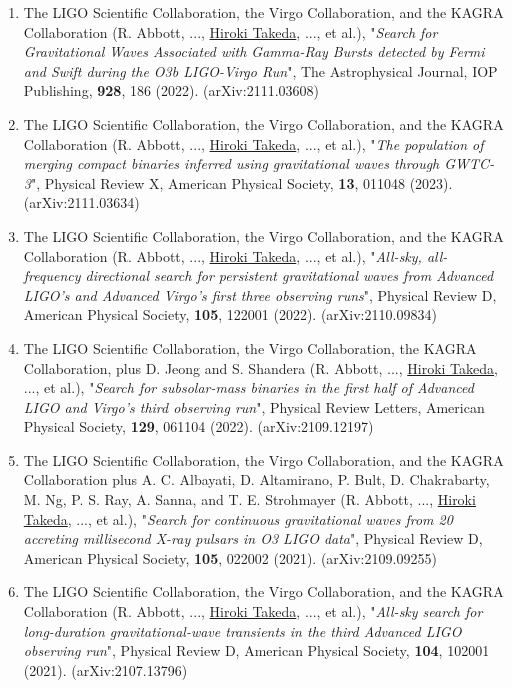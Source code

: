 \documentclass[uplatex, 11pt]{jsarticle}
\begin{document}
\begin{enumerate}
\item The LIGO Scientific Collaboration, the Virgo Collaboration, and the KAGRA Collaboration (R. Abbott, ..., \uline{Hiroki Takeda}, ..., et al.),
"\emph{Search for Gravitational Waves Associated with Gamma-Ray Bursts detected by Fermi and Swift during the O3b LIGO-Virgo Run}",
The Astrophysical Journal, IOP Publishing, {\bf 928}, 186 (2022).
(arXiv:2111.03608) \\

\item The LIGO Scientific Collaboration, the Virgo Collaboration, and the KAGRA Collaboration (R. Abbott, ..., \uline{Hiroki Takeda}, ..., et al.), "\emph{The population of merging compact binaries inferred using gravitational waves through GWTC-3}", Physical Review X, American Physical Society, {\bf 13}, 011048 (2023). (arXiv:2111.03634)\\

\item The LIGO Scientific Collaboration, the Virgo Collaboration, and the KAGRA Collaboration (R. Abbott, ..., \uline{Hiroki Takeda}, ..., et al.), "\emph{All-sky, all-frequency directional search for persistent gravitational waves from Advanced LIGO's and Advanced Virgo's first three observing runs}", Physical Review D, American Physical Society, {\bf 105}, 122001 (2022). (arXiv:2110.09834)\\

\item The LIGO Scientific Collaboration, the Virgo Collaboration, the KAGRA Collaboration, plus D. Jeong and S. Shandera (R. Abbott, ..., \uline{Hiroki Takeda}, ..., et al.), "\emph{Search for subsolar-mass binaries in the first half of Advanced LIGO and Virgo's third observing run}", Physical Review Letters, American Physical Society, {\bf 129}, 061104 (2022). (arXiv:2109.12197)\\

\item The LIGO Scientific Collaboration, the Virgo Collaboration, and the KAGRA Collaboration plus A. C. Albayati, D. Altamirano, P. Bult, D. Chakrabarty, M. Ng, P. S. Ray, A. Sanna, and T. E. Strohmayer (R. Abbott, ..., \uline{Hiroki Takeda}, ..., et al.), "\emph{Search for continuous gravitational waves from 20 accreting millisecond X-ray pulsars in O3 LIGO data}", Physical Review D, American Physical Society, {\bf 105}, 022002 (2021). (arXiv:2109.09255)\\

\item The LIGO Scientific Collaboration, the Virgo Collaboration, and the KAGRA Collaboration (R. Abbott, ..., \uline{Hiroki Takeda}, ..., et al.), "\emph{All-sky search for long-duration gravitational-wave transients in the third Advanced LIGO observing run}", Physical Review D, American Physical Society, {\bf 104}, 102001 (2021). (arXiv:2107.13796)\\


\end{enumerate}
\end{document}
